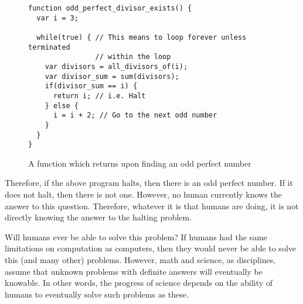 \begin{figure}[H]
\begin{mdframed}
\begin{verbatim}
function odd_perfect_divisor_exists() {
  var i = 3;

  while(true) { // This means to loop forever unless terminated 
                // within the loop
    var divisors = all_divisors_of(i);
    var divisor_sum = sum(divisors);
    if(divisor_sum == i) {
      return i; // i.e. Halt
    } else {
      i = i + 2; // Go to the next odd number
    }
  }
}
\end{verbatim}
\end{mdframed}
\caption{A function which returns upon finding an odd perfect number}
\end{figure}

Therefore, if the above program halts, then there is an odd perfect number.  If it does not halt, then there is not one.  However, no human currently knows the answer to this question.  Therefore, whatever it is that humans are doing, it is not directly knowing the answer to the halting problem.

Will humans ever be able to solve this problem?  If humans had the same limitations on computation as computers, then they would never be able to solve this (and many other) problems.  However, math and science, as disciplines, assume that unknown problems with definite answers will eventually be knowable.  In other words, the progress of science depends on the ability of humans to eventually solve such problems as these.

